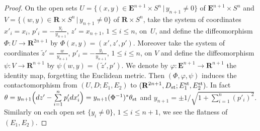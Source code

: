 \documentclass[pdftex]{sigma}
\begin{document}
\begin{proof}
On the open sets $U = \{ (x, y) \in {\mathbf{E}}^{n+1}\times S^n
\,|\, y_{n+1} \not= 0 \}$ of ${\mathbf{E}}^{n+1}\times S^n$
and $V = \{ (w, y) \in {\mathbf{R}}\times S^n \,|\,
 y_{n+1} \not= 0 \}$ of ${\mathbf{R}}\times S^n$,
take the system of coordinates $x'_i = x_i$, $p'_i = - \frac{y_i}{y_{n+1}}$,
$z' = x_{n+1}$, $1 \leq i \leq n$, on~$U$, and def\/ine
the dif\/feomorphism $\Phi \colon  U \to {\mathbf{R}}^{2n+1}$ by $\Phi(x, y) = (x', z', p')$.
Moreover take the system of coordinates
$\tilde{z}' = \frac{w}{y_{n+1}}$, $p'_i = - \frac{y_i}{y_{n+1}}$,
$1 \leq i \leq n$, on $V$ and def\/ine the dif\/feomorphism
$\psi \colon  V \to {\mathbf{R}}^{n+1}$ by $\psi(w, y) = (\tilde{z}', p')$.
We denote by $\varphi \colon  {\mathbf{E}}^{n+1} \to
{\mathbf{R}}^{n+1}$ the identity map, forgetting the Euclidean metric.
Then $(\Phi, \varphi, \psi)$ induces the contactomorphism from
$(U, D; E_1, E_2)$ to $({\mathbf{R}}^{2n+1}, D_{\rm{st}};
E^{\rm{st}}_1, E^{\rm{st}}_2)$.
In fact $\theta = y_{n+1}\Big(dz' - \sum\limits_{i=1}^n p'_i dx'_i\Big) =
y_{n+1}(\Phi^{-1})^*\theta_{\rm{st}}$ and
$y_{n+1} = \pm 1\Big/\sqrt{1 + \sum\limits_{i=1}^n (p'_i)^2}$.
Similarly on each open set $\{ y_i \not= 0\}$, $1 \leq i \leq n+1$,
we see the f\/latness of $(E_1, E_2)$.
\end{proof}
\end{document}
